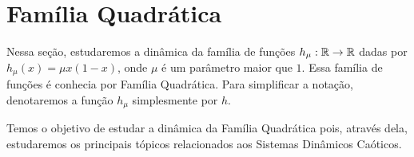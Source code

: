 \section{Família Quadrática}

Nessa seção, estudaremos a dinâmica da família de funções $h_\mu: \mathbb{R} \to \mathbb{R}$ dadas por $h_\mu(x) = \mu x(1-x)$, onde $\mu$ é um parâmetro maior que $1$.
Essa família de funções é conhecia por Família Quadrática.
Para simplificar a notação, denotaremos a função $h_\mu$ simplesmente por $h$. 

Temos o objetivo de estudar a dinâmica da Família Quadrática pois, através dela,  estudaremos os principais tópicos relacionados aos Sistemas Dinâmicos Caóticos.